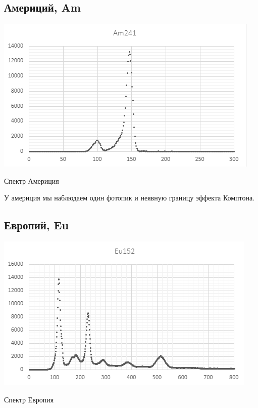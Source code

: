 \documentclass[a4paper,12pt]{article} %
\begin{document}
\subsection*{Америций, Am}
\begin{center}
\includegraphics[scale=0.4]{Am}

Спектр Америция
\end{center}

У америция мы наблюдаем один фотопик и неявную границу эффекта Комптона.

\subsection*{Европий, Eu}

\begin{center}
\includegraphics[scale=0.4]{Eu}

Спектр Европия
\end{center}
\end{document}
